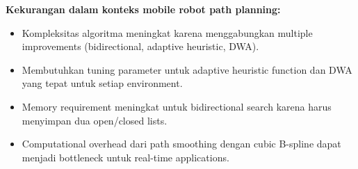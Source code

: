 \textbf{Kekurangan dalam konteks mobile robot path planning:}
\begin{itemize}
    \item Kompleksitas algoritma meningkat karena menggabungkan multiple improvements (bidirectional, adaptive heuristic, DWA).
    \item Membutuhkan tuning parameter untuk adaptive heuristic function dan DWA yang tepat untuk setiap environment.
    \item Memory requirement meningkat untuk bidirectional search karena harus menyimpan dua open/closed lists.
    \item Computational overhead dari path smoothing dengan cubic B-spline dapat menjadi bottleneck untuk real-time applications.
\end{itemize}
